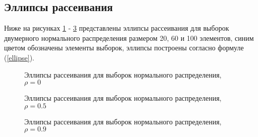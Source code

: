 \documentclass[12pt]{article}
\begin{document}
\subsection{Эллипсы рассеивания}
Ниже на рисунках \ref{rho_0} - \ref{rho_09} представлены эллипсы рассеивания для выборок двумерного нормального распределения размером 20, 60 и 100 элементов, синим цветом обозначены элементы выборок, эллипсы построены согласно формуле (\ref{ellipse}).
\begin{figure}[h]
    \begin{minipage}[h]{0.5\linewidth}
    \end{minipage}
    \begin{minipage}[h]{0.5\linewidth}
    \end{minipage}
    \begin{minipage}[h]{0.5\linewidth}
    \end{minipage}
    \caption{Эллипсы рассеивания для выборок нормального распределения, $\rho = 0$}
    \label{rho_0}
\end{figure}

\begin{figure}[h]
    \begin{minipage}[h]{0.5\linewidth}
    \end{minipage}
    \begin{minipage}[h]{0.5\linewidth}
    \end{minipage}
    \begin{minipage}[h]{0.5\linewidth}
    \end{minipage}
    \caption{Эллипсы рассеивания для выборок нормального распределения, $\rho = 0.5$}
    \label{rho_05}
\end{figure}

\begin{figure}[h!]
    \begin{minipage}[h]{0.5\linewidth}
    \end{minipage}
    \begin{minipage}[h]{0.5\linewidth}
    \end{minipage}
    \begin{minipage}[h]{0.5\linewidth}
    \end{minipage}
    \caption{Эллипсы рассеивания для выборок нормального распределения, $\rho = 0.9$}
    \label{rho_09}
\end{figure}
\end{document}
